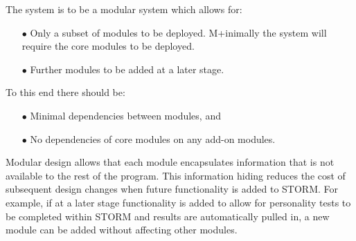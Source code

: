 \begin{flushleft}
The system is to be a modular system which allows for:
\end{flushleft}

\begin{itemize} 
\item[$\bullet$] Only a subset of modules to be deployed. M+inimally the system will require the core modules to be deployed.
\item[$\bullet$] Further modules to be added at a later stage.
\end{itemize}

\begin{flushleft}
To this end there should be:
\end{flushleft}

\begin{itemize} 
\item[$\bullet$] Minimal dependencies between modules, and
\item[$\bullet$] No dependencies of core modules on any add-on modules.
\end{itemize}

\begin{flushleft}
Modular design allows that each module encapsulates information that is not available to the rest of the program. This information hiding reduces the cost of subsequent design changes when future functionality is added to STORM. For example, if at a later stage functionality is added to allow for personality tests to be completed within STORM and results are automatically pulled in, a new module can be added without affecting other modules.
\end{flushleft}